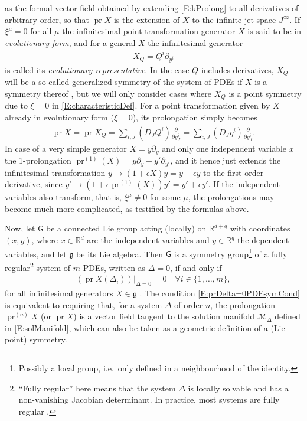 \documentclass[a4paper,hidelinks, 12pt]{article}
\numberwithin{equation}{section}
\theoremstyle{plain}
\newcommand{\La}{\mathfrak}
\newcommand{\Lg}{\mathsf}
\newcommand{\on}{\operatorname}
\begin{document}
as the formal vector field obtained by extending \eqref{E:kProlong} to all
derivatives of arbitrary order, so that $\operatorname{pr} X$ is the extension
of $X$ to the infinite jet space $J^\infty$.
If $\xi^\mu=0$ for all $\mu$ the infinitesimal point transformation generator $X$ is said to be in \textit{evolutionary form}, and for a general $X$ the infinitesimal generator 
\begin{align}\label{E:evolRepr}
	X_Q=Q^i\partial_{y^i}
\end{align}
 is called its \textit{evolutionary representative}.
 In the case $Q$ includes derivatives, $X_Q$ will be a so-called generalized symmetry of the system of PDEs if $X$ is a symmetry thereof \cite{olver1998applications}, but we will only consider cases where $X_Q$ is a point symmetry due to $\xi=0$ in \eqref{E:characteristicDef}.
 For a point transformation given by $X$ already in evolutionary form ($\xi=0$), its prolongation simply becomes
\begin{align}
	\on{pr}X= \on{pr}X_Q =\sum_{i,J}(D_JQ^i) \frac{\partial}{\partial y^i_J}=  \sum_{i,J}(D_J\eta^i) \frac{\partial}{\partial y^i_J}.
\end{align} 
In case of a very simple generator $X=y \partial_y$ and only one independent variable $x$ the 1-prolongation $\on{pr}^{(1)}(X)=y \partial_y+ y' \partial_{y'}$, and it hence just extends the infinitesimal transformation $y\to (1+\epsilon X) y= y+\epsilon y$ to the first-order derivative, since $y'\to (1+\epsilon \on{pr}^{(1)}(X)) y'= y'+\epsilon y'$. If the independent variables also transform, that is, $\xi^\mu \ne 0$ for some $\mu$, the prolongations may become much more complicated, as testified by the formulas above.

 
Now, let $\Lg{G}$ be a connected Lie group acting (locally) on $\mathbb{R}^{d+q}$
with coordinates $(x,y)$, where $x \in \mathbb{R}^d$ are the independent
variables and $y \in \mathbb{R}^q$ the dependent variables, and let $\La{g}$
be its Lie algebra. Then $\Lg{G}$ is a symmetry group\footnote{Possibly a
local group, i.e.~only defined in a neighbourhood of the identity.} of a
fully regular\footnote{``Fully regular'' here means that the system $\Delta$
is locally solvable and has a non-vanishing Jacobian determinant. In practice,
most systems are fully regular \cite{OlverLecturesLGaDE}.} system of $m$
PDEs, written as $\Delta=0$, if and only if
\begin{align}\label{E:prDelta=0PDEsymCond}
	 (\on{pr}X(\Delta_i))|_{\Delta = 0}=0 \quad \forall i\in \{1,\ldots,m\},  
\end{align}
for all infinitesimal generators $X\in \La{g}$ \cite{OlverLecturesLGaDE}. 
The condition \eqref{E:prDelta=0PDEsymCond} is equivalent to requiring that,
for a system $\Delta$ of order $n$, the prolongation $\operatorname{pr}^{(n)}X$
(or $\operatorname{pr}X$) is a vector field tangent to the solution manifold
$\mathcal{M}_\Delta$ defined in \eqref{E:solManifold}, which can also be
taken as a geometric definition of a (Lie point) symmetry.
\end{document}
